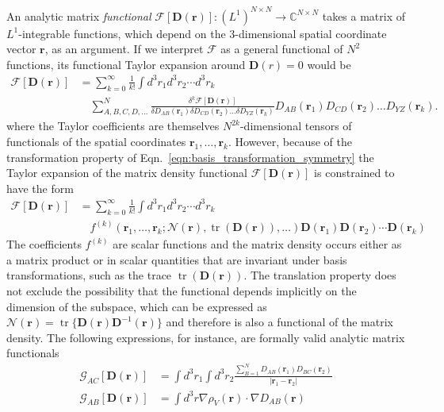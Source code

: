\documentclass[journal=jpclcd,manuscript=letter]{achemso}
\DeclareMathOperator{\tr}{tr}
\newcommand\m[1]{\mathbf{#1}}
\renewcommand\vec[1]{\mathbf{#1}}
\begin{document}
An analytic matrix \emph{functional} $\mathcal{F}[\m{D}(\vec{r})] : (L^1)^{N \times N} \to \mathbb{C}^{N \times N}$ takes a matrix of $L^1$-integrable functions, which depend on the 3-dimensional spatial coordinate vector $\vec{r}$, as an argument.
If we interpret $\mathcal{F}$ as a general functional of $N^2$ functions, its functional Taylor expansion around $\m{D}(r) = 0$ would be
\begin{equation}
  \begin{split}
    \mathcal{F}[\m{D}(\vec{r})] & = \sum_{k=0}^{\infty} \frac{1}{k!} \int d^3\!r_1 d^3\!r_2 \cdots d^3\!r_k ~ \\
    & \quad \sum_{A,B,C,D,\ldots}^{N} \frac{\delta^{k} \mathcal{F}[\m{D}(\vec{r})]}{\delta D_{AB}(\vec{r}_1) \delta D_{CD}(\vec{r}_2) \ldots \delta D_{YZ}(\vec{r}_k)} D_{AB}(\vec{r}_1) D_{CD}(\vec{r}_2) \ldots D_{YZ}(\vec{r}_k).
  \end{split}
\end{equation}
where the Taylor coefficients are themselves $N^{2 k}$-dimensional tensors of functionals of the spatial coordinates $\vec{r}_1,\ldots,\vec{r}_k$.
However, because of the transformation property of Eqn.~\ref{eqn:basis_transformation_symmetry} the Taylor expansion of the matrix density functional
$\mathcal{F}[\m{D}(\vec{r})]$ is constrained to have the form
\begin{equation}
 \begin{split}
   \mathcal{F}[\m{D}(\vec{r})] &= \sum_{k=0}^{\infty} \frac{1}{k!} \int d^3\!r_1 d^3\!r_2 \cdots d^3\!r_k ~ \\
   & \quad f^{(k)}(\vec{r}_1,\ldots,\vec{r}_k; \mathcal{N}(\vec{r}), \tr(\m{D}(\vec{r})), \ldots) \m{D}(\vec{r}_1) \m{D}(\vec{r}_2) \cdots \m{D}(\vec{r}_k) \label{eqn:functional_taylor_expansion}
 \end{split}
\end{equation}
The coefficients $f^{(k)}$ are scalar functions and the matrix density occurs either as a matrix product or in scalar quantities that are invariant under basis transformations, such as the trace $\tr(\mathbf{D}(\vec{r}))$.
The translation property does not exclude the possibility that the functional depends implicitly on the dimension of the subspace, which can be expressed as $\mathcal{N}(\vec{r}) = \tr\{\m{D}(\vec{r}) \m{D}^{-1}(\vec{r})\}$ and therefore is also a functional of the matrix density.
The following expressions, for instance, are formally valid analytic matrix functionals
\begin{align}
  \mathcal{G}_{AC}[\m{D}(\vec{r})] &= \int d^3\!r_1 \int d^3\!r_2 \frac{\sum_{B=1}^{N} D_{AB}(\vec{r}_1) D_{BC}(\vec{r}_2)}{\vert \vec{r}_1 - \vec{r}_2 \vert} \\
  \mathcal{G}_{AB}[\m{D}(\vec{r})] &= \int d^3\!r \nabla \rho_{V}(\vec{r}) \cdot \nabla D_{AB}(\vec{r})
\end{align}
\end{document}
